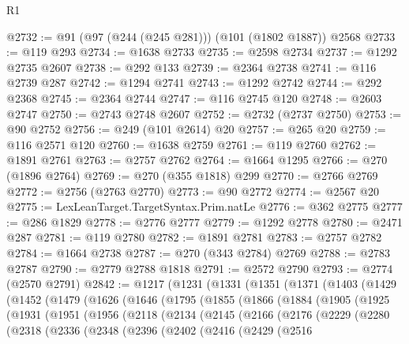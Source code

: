 \begin{lexlean}{R1}
\begin{coremodule}
@2732 := @91 (@97 (@244 (@245 @281))) (@101 (@1802 @1887)) @2568
@2733 := @119 @293
@2734 := @1638 @2733
@2735 := @2598 @2734
@2737 := @1292 @2735 @2607
@2738 := @292 @133
@2739 := @2364 @2738
@2741 := @116 @2739 @287
@2742 := @1294 @2741
@2743 := @1292 @2742
@2744 := @292 @2368
@2745 := @2364 @2744
@2747 := @116 @2745 @120
@2748 := @2603 @2747
@2750 := @2743 @2748 @2607
@2752 := @2732 (@2737 @2750)
@2753 := @90 @2752
@2756 := @249 (@101 @2614) @20
@2757 := @265 @20
@2759 := @116 @2571 @120
@2760 := @1638 @2759
@2761 := @119 @2760
@2762 := @1891 @2761
@2763 := @2757 @2762
@2764 := @1664 @1295
@2766 := @270 (@1896 @2764)
@2769 := @270 (@355 @1818) @299
@2770 := @2766 @2769
@2772 := @2756 (@2763 @2770)
@2773 := @90 @2772
@2774 := @2567 @20
@2775 := LexLeanTarget.TargetSyntax.Prim.natLe
@2776 := @362 @2775
@2777 := @286 @1829
@2778 := @2776 @2777
@2779 := @1292 @2778
@2780 := @2471 @287
@2781 := @119 @2780
@2782 := @1891 @2781
@2783 := @2757 @2782
@2784 := @1664 @2738
@2787 := @270 (@343 @2784) @2769
@2788 := @2783 @2787
@2790 := @2779 @2788 @1818
@2791 := @2572 @2790
@2793 := @2774 (@2570 @2791)
@2842 := @1217
    (@1231
      (@1331
        (@1351
          (@1371
            (@1403
              (@1429
                (@1452
                  (@1479
                    (@1626
                      (@1646
                        (@1795
                          (@1855
                            (@1866
                              (@1884
                                (@1905
                                  (@1925
                                    (@1931
                                      (@1951
                                        (@1956
                                          (@2118
                                            (@2134
                                              (@2145
                                                (@2166
                                                  (@2176
                                                    (@2229
                                                      (@2280
                                                        (@2318
                                                          (@2336
                                                            (@2348
                                                              (@2396
                                                                (@2402
                                                                  (@2416
                                                                    (@2429
                                                                      (@2516

\end{coremodule}
\end{lexlean}
